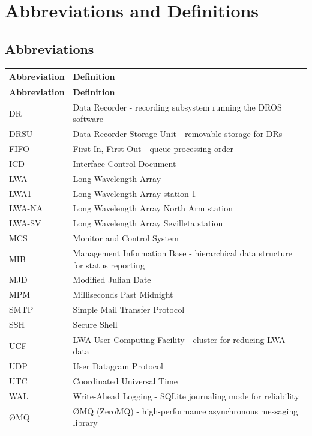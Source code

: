 
\chapter{Abbreviations and Definitions}
\label{sec:abbreviations}

\section{Abbreviations}

\begin{longtable}{|l|p{10cm}|}
    \hline
    \textbf{Abbreviation} & \textbf{Definition} \\
    \hline
    \endfirsthead
    \hline
    \textbf{Abbreviation} & \textbf{Definition} \\
    \hline
    \endhead
    \hline
    \endfoot
    DR & Data Recorder - recording subsystem running the DROS software \\
    \hline
    DRSU & Data Recorder Storage Unit - removable storage for DRs \\
    \hline
    FIFO & First In, First Out - queue processing order \\
    \hline
    ICD & Interface Control Document \\
    \hline
    LWA & Long Wavelength Array \\
    \hline
    LWA1 & Long Wavelength Array station 1 \\
    \hline
    LWA-NA & Long Wavelength Array North Arm station \\
    \hline
    LWA-SV & Long Wavelength Array Sevilleta station \\
    \hline
    MCS & Monitor and Control System \\
    \hline
    MIB & Management Information Base - hierarchical data structure for status reporting \\
    \hline
    MJD & Modified Julian Date \\
    \hline
    MPM & Milliseconds Past Midnight \\
    \hline
    SMTP & Simple Mail Transfer Protocol \\
    \hline
    SSH & Secure Shell \\
    \hline
    UCF & LWA User Computing Facility - cluster for reducing LWA data \\
    \hline
    UDP & User Datagram Protocol \\
    \hline
    UTC & Coordinated Universal Time \\
    \hline
    WAL & Write-Ahead Logging - SQLite journaling mode for reliability \\
    \hline
    \O{}MQ & \O{}MQ (ZeroMQ) - high-performance asynchronous messaging library \\
    \hline
\end{longtable}


